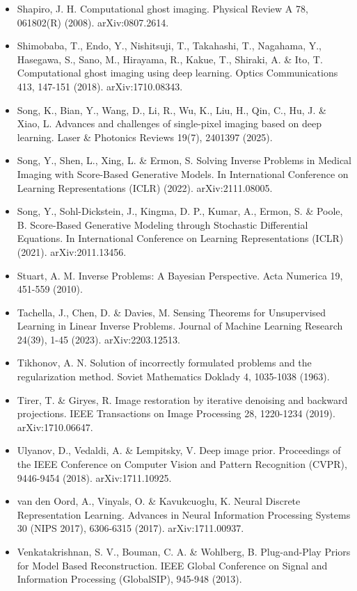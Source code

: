 \documentclass[11pt]{article}
\begin{document}
\begin{itemize}
\item Shapiro, J. H. Computational ghost imaging. Physical Review A 78, 061802(R) (2008). arXiv:0807.2614.
\item Shimobaba, T., Endo, Y., Nishitsuji, T., Takahashi, T., Nagahama, Y., Hasegawa, S., Sano, M., Hirayama, R., Kakue, T., Shiraki, A. \& Ito, T. Computational ghost imaging using deep learning. Optics Communications 413, 147-151 (2018). arXiv:1710.08343.
\item Song, K., Bian, Y., Wang, D., Li, R., Wu, K., Liu, H., Qin, C., Hu, J. \& Xiao, L. Advances and challenges of single-pixel imaging based on deep learning. Laser \& Photonics Reviews 19(7), 2401397 (2025).
\item Song, Y., Shen, L., Xing, L. \& Ermon, S. Solving Inverse Problems in Medical Imaging with Score-Based Generative Models. In International Conference on Learning Representations (ICLR) (2022). arXiv:2111.08005.
\item Song, Y., Sohl-Dickstein, J., Kingma, D. P., Kumar, A., Ermon, S. \& Poole, B. Score-Based Generative Modeling through Stochastic Differential Equations. In International Conference on Learning Representations (ICLR) (2021). arXiv:2011.13456.
\item Stuart, A. M. Inverse Problems: A Bayesian Perspective. Acta Numerica 19, 451-559 (2010).
\item Tachella, J., Chen, D. \& Davies, M. Sensing Theorems for Unsupervised Learning in Linear Inverse Problems. Journal of Machine Learning Research 24(39), 1-45 (2023). arXiv:2203.12513.
\item Tikhonov, A. N. Solution of incorrectly formulated problems and the regularization method. Soviet Mathematics Doklady 4, 1035-1038 (1963).
\item Tirer, T. \& Giryes, R. Image restoration by iterative denoising and backward projections. IEEE Transactions on Image Processing 28, 1220-1234 (2019). arXiv:1710.06647.
\item Ulyanov, D., Vedaldi, A. \& Lempitsky, V. Deep image prior. Proceedings of the IEEE Conference on Computer Vision and Pattern Recognition (CVPR), 9446-9454 (2018). arXiv:1711.10925.
\item van den Oord, A., Vinyals, O. \& Kavukcuoglu, K. Neural Discrete Representation Learning. Advances in Neural Information Processing Systems 30 (NIPS 2017), 6306-6315 (2017). arXiv:1711.00937.
\item Venkatakrishnan, S. V., Bouman, C. A. \& Wohlberg, B. Plug-and-Play Priors for Model Based Reconstruction. IEEE Global Conference on Signal and Information Processing (GlobalSIP), 945-948 (2013).

\end{itemize}
\end{document}
